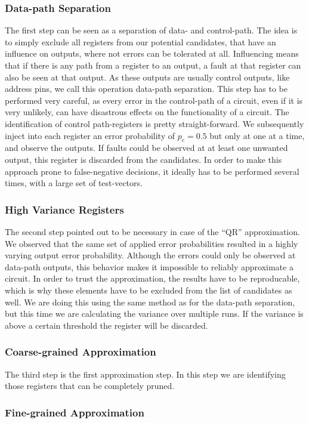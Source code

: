 \documentclass[conference]{IEEEtran}
\begin{document}
\subsubsection{Data-path Separation}
The first step can be seen as a separation of data- and control-path. The idea is to simply exclude all registers from our potential candidates, that have an influence on outputs, where not errors can be tolerated at all. Influencing means that if there is any path from a register to an output, a fault at that register can also be seen at that output. As these outputs are usually control outputs, like address pins, we call this operation data-path separation. This step has to be performed very careful, as every error in the control-path of a circuit, even if it is very unlikely, can have disastrous effects on the functionality of a circuit. The identification of control path-registers is pretty straight-forward. We subsequently inject into each register an error probability of $p_e=0.5$ but only at one at a time, and observe the outputs. If faults could be observed at at least one unwanted output, this register is discarded from the candidates. In order to make this approach prone to false-negative decisions, it ideally has to be performed several times, with a large set of test-vectors.
\subsubsection{High Variance Registers}
The second step pointed out to be necessary in case of the ``QR'' approximation. We observed that the same set of applied error probabilities resulted in a highly varying output error probability. Although the errors could only be observed at data-path outputs, this behavior makes it impossible to reliably approximate a circuit. In order to trust the approximation, the results have to be reproducable, which is why these elements have to be excluded from the list of candidates as well. We are doing this using the same method as for the data-path separation, but this time we are calculating the variance over multiple runs. If the variance is above a certain threshold the register will be discarded. 
\subsubsection{Coarse-grained Approximation}
The third step is the first approximation step. In this step we are identifying those registers that can be completely pruned.
\subsubsection{Fine-grained Approximation}
\end{document}

